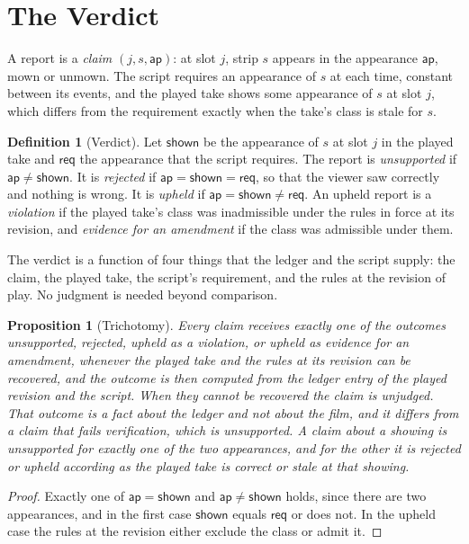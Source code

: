 \documentclass[11pt,twoside,openright]{book}
\theoremstyle{plain}
\newtheorem{proposition}[theorem]{Proposition}
\theoremstyle{definition}
\newtheorem{definition}[theorem]{Definition}
\theoremstyle{remark}
\begin{document}
\section{The Verdict}\label{sec:verdict}

A report is a \emph{claim} $(j,s,\mathsf{ap})$: at slot $j$, strip $s$ appears in the appearance $\mathsf{ap}$, mown or unmown. The script requires an appearance of $s$ at each time, constant between its events, and the played take shows some appearance of $s$ at slot $j$, which differs from the requirement exactly when the take's class is stale for $s$.

\begin{definition}[Verdict]\label{def:verdict7}
Let $\mathsf{shown}$ be the appearance of $s$ at slot $j$ in the played take and $\mathsf{req}$ the appearance that the script requires. The report is \emph{unsupported} if $\mathsf{ap}\neq\mathsf{shown}$. It is \emph{rejected} if $\mathsf{ap}=\mathsf{shown}=\mathsf{req}$, so that the viewer saw correctly and nothing is wrong. It is \emph{upheld} if $\mathsf{ap}=\mathsf{shown}\neq\mathsf{req}$. An upheld report is a \emph{violation} if the played take's class was inadmissible under the rules in force at its revision, and \emph{evidence for an amendment} if the class was admissible under them.
\end{definition}

The verdict is a function of four things that the ledger and the script supply: the claim, the played take, the script's requirement, and the rules at the revision of play. No judgment is needed beyond comparison.

\begin{proposition}[Trichotomy]\label{prop:trichotomy}
Every claim receives exactly one of the outcomes unsupported, rejected, upheld as a violation, or upheld as evidence for an amendment, whenever the played take and the rules at its revision can be recovered, and the outcome is then computed from the ledger entry of the played revision and the script. When they cannot be recovered the claim is \emph{unjudged}. That outcome is a fact about the ledger and not about the film, and it differs from a claim that fails verification, which is unsupported. A claim about a showing is unsupported for exactly one of the two appearances, and for the other it is rejected or upheld according as the played take is correct or stale at that showing.
\end{proposition}

\begin{proof}
Exactly one of $\mathsf{ap}=\mathsf{shown}$ and $\mathsf{ap}\neq\mathsf{shown}$ holds, since there are two appearances, and in the first case $\mathsf{shown}$ equals $\mathsf{req}$ or does not. In the upheld case the rules at the revision either exclude the class or admit it.
\end{proof}
\end{document}
